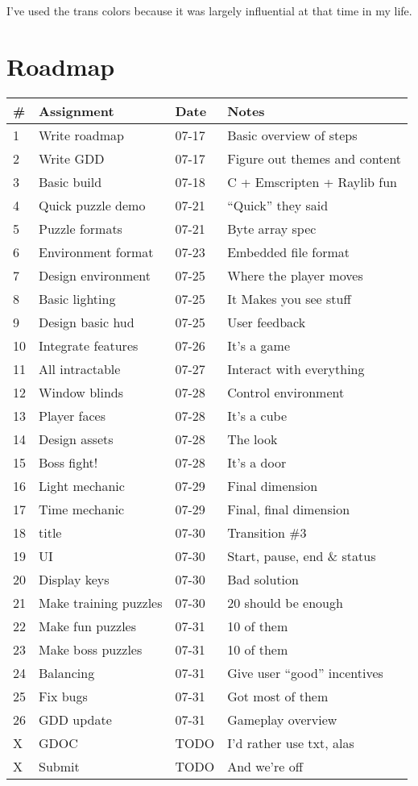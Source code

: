 \documentclass[12pt, letterpaper]{article}
\begin{document}
I've used the trans colors because it was largely influential at that time in
my life.

\section{Roadmap}

\bgroup
\def\arraystretch{1.5}
\begin{tabular}{ R{0.4cm} p{4cm} p{1.5cm} p{5.5cm} }
\toprule
{} & \textbf{Assignment} & \textbf{Date} & \textbf{Notes} \\ 
 & Write roadmap & 07-17 & Basic overview of steps \\
2 & Write GDD & 07-17 & Figure out themes and content \\
3 & Basic build & 07-18 & C + Emscripten + Raylib fun \\
4 & Quick puzzle demo & 07-21 & ``Quick'' they said \\
5 & Puzzle formats & 07-21 & Byte array spec \\
6 & Environment format & 07-23 & Embedded file format \\
7 & Design environment & 07-25 & Where the player moves \\
8 & Basic lighting & 07-25 & It Makes you see stuff \\
9 & Design basic hud & 07-25 & User feedback \\
10 & Integrate features & 07-26 & It's a game \\
11 & All intractable & 07-27 & Interact with everything \\
12 & Window blinds & 07-28 & Control environment \\
13 & Player faces & 07-28 & It's a cube \\
14 & Design assets & 07-28 & The look \\
15 & Boss fight! & 07-28 & It's a door \\
16 & Light mechanic & 07-29 & Final dimension \\
17 & Time mechanic & 07-29 & Final, final dimension \\
18 & title & 07-30 & Transition \#3 \\
19 & UI & 07-30 & Start, pause, end \& status \\
20 & Display keys & 07-30 & Bad solution \\
21 & Make training puzzles & 07-30 & 20 should be enough \\
22 & Make fun puzzles & 07-31 & 10 of them \\
23 & Make boss puzzles & 07-31 & 10 of them \\
24 & Balancing & 07-31 & Give user ``good'' incentives \\
25 & Fix bugs & 07-31 & Got most of them \\
26 & GDD update & 07-31 & Gameplay overview \\

X & GDOC & TODO & I'd rather use txt, alas \\
X & Submit & TODO & And we're off \\

\bottomrule
\end{tabular}
\egroup
\end{document}
